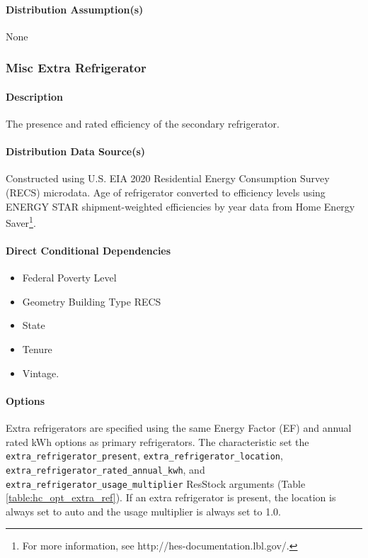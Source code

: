 \paragraph{Distribution Assumption(s)}
None

\subsubsection{Misc Extra Refrigerator}
\paragraph{Description}
The presence and rated efficiency of the secondary refrigerator.

\paragraph{Distribution Data Source(s)}
Constructed using U.S. EIA 2020 Residential Energy Consumption Survey (RECS) microdata. Age of refrigerator converted to efficiency levels using ENERGY STAR shipment-weighted efficiencies by year data from Home Energy Saver\footnote{For more information, see http://hes-documentation.lbl.gov/.}. %

\paragraph{Direct Conditional Dependencies}
\begin{itemize}
    \item Federal Poverty Level
    \item Geometry Building Type RECS
    \item State
    \item Tenure
    \item Vintage.
\end{itemize}

\paragraph{Options}
Extra refrigerators are specified using the same Energy Factor (EF) and annual rated kWh options as primary refrigerators.  The characteristic set the \texttt{extra\_refrigerator\_present}, \texttt{extra\_refrigerator\_location}, \texttt{extra\_refrigerator\_rated\_annual\_kwh}, and \texttt{extra\_refrigerator\_usage\_multiplier} ResStock arguments (Table \ref{table:hc_opt_extra_ref}). If an extra refrigerator is present, the location is always set to auto and the usage multiplier is always set to 1.0.


